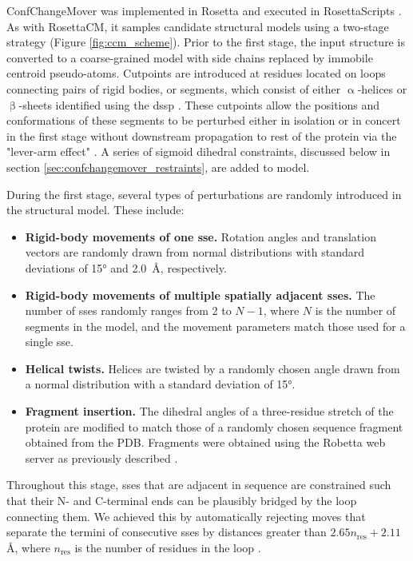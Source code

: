 ConfChangeMover was implemented in Rosetta and executed in RosettaScripts \citep*{Fleishman2011}. As with RosettaCM, it samples candidate structural models using a two-stage strategy (Figure \ref{fig:ccm_scheme}). Prior to the first stage, the input structure is converted to a coarse-grained model with side chains replaced by immobile centroid pseudo-atoms. Cutpoints are introduced at residues located on loops connecting pairs of rigid bodies, or segments, which consist of either $\mathrm{\upalpha}$-helices or $\mathrm{\upbeta}$-sheets identified using the \gls{dssp} \citep*{Kabsch1983}. These cutpoints allow the positions and conformations of these segments to be perturbed either in isolation or in concert in the first stage without downstream propagation to rest of the protein via the "lever-arm effect" \citep*{Tyka2012}. A series of sigmoid dihedral constraints, discussed below in section \ref{sec:confchangemover_restraints}, are added to model.

During the first stage, several types of perturbations are randomly introduced in the structural model. These include:

\begin{itemize}
    \item \textbf{Rigid-body movements of one \gls{sse}.} Rotation angles and translation vectors are randomly drawn from normal distributions with standard deviations of 15° and \SI{2.0}{\angstrom}, respectively.
    \item \textbf{Rigid-body movements of multiple spatially adjacent \gls{sse}s.} The number of \gls{sse}s randomly ranges from 2 to $N-1$, where $N$ is the number of segments in the model, and the movement parameters match those used for a single \gls{sse}.
    \item \textbf{Helical twists.} Helices are twisted by a randomly chosen angle drawn from a normal distribution with a standard deviation of 15°.
    \item \textbf{Fragment insertion.} The dihedral angles of a three-residue stretch of the protein are modified to match those of a randomly chosen sequence fragment obtained from the PDB. Fragments were obtained using the Robetta web server as previously described \citep*{Kim2004}.
\end{itemize}

Throughout this stage, \gls{sse}s that are adjacent in sequence are constrained such that their N- and C-terminal ends can be plausibly bridged by the loop connecting them. We achieved this by automatically rejecting moves that separate the termini of consecutive \gls{sse}s by distances greater than $2.65n_{\mathup{res}}+2.11$ \AA, where $n_{\mathup{res}}$ is the number of residues in the loop \citep*{Woetzel2012}.

